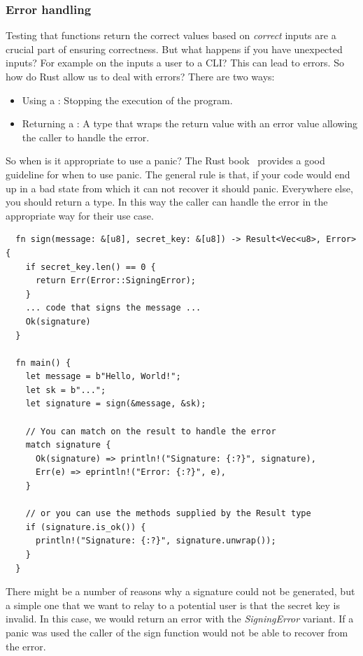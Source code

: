 \documentclass[twoside,11pt]{report}
\theoremstyle{definition}
\theoremstyle{plain}
\begin{document}
\subsubsection{Error handling}\label{sec:rusterror} %
Testing that functions return the correct values based on \textit{correct} inputs are a crucial part of ensuring correctness. But what happens if you have unexpected inputs? For example on the inputs a user to a CLI\@? This can lead to errors. So how do Rust allow us to deal with errors? There are two ways:
\begin{itemize}
  \item Using a : Stopping the execution of the program.
  \item Returning a : A type that wraps the return value with an error value allowing the caller to handle the error.
\end{itemize}
So when is it appropriate to use a panic? The Rust book~\cite[ch.9.3]{rustlangRustProgramming} provides a good guideline for when to use panic.
The general rule is that, if your code would end up in a bad state from which it can not recover it should panic. Everywhere else, you should return a  type. In this way the caller can handle the error in the appropriate way for their use case.
\begin{verbatim}
  fn sign(message: &[u8], secret_key: &[u8]) -> Result<Vec<u8>, Error> {
    if secret_key.len() == 0 {
      return Err(Error::SigningError);
    }
    ... code that signs the message ...
    Ok(signature)
  }

  fn main() {
    let message = b"Hello, World!";
    let sk = b"...";
    let signature = sign(&message, &sk);

    // You can match on the result to handle the error
    match signature {
      Ok(signature) => println!("Signature: {:?}", signature),
      Err(e) => eprintln!("Error: {:?}", e),
    }

    // or you can use the methods supplied by the Result type
    if (signature.is_ok()) {
      println!("Signature: {:?}", signature.unwrap());
    } 
  }
\end{verbatim}
There might be a number of reasons why a signature could not be generated, but a simple one that we want to relay to a potential user is that the secret key is invalid. In this case, we would return an error with the \textit{SigningError} variant. If a panic was used the caller of the sign function would not be able to recover from the error.
\end{document}
